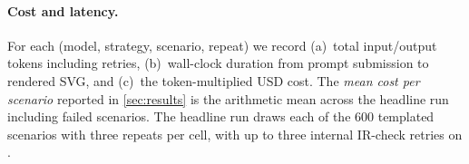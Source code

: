 \paragraph{Cost and latency.}
For each (model, strategy, scenario, repeat) we record (a)~total input/output tokens including retries, (b)~wall-clock duration from prompt submission to rendered SVG, and (c)~the token-multiplied USD cost.
The \emph{mean cost per scenario} reported in \cref{sec:results} is the arithmetic mean across the headline run including failed scenarios.
The headline run draws each of the $600$ templated scenarios with three repeats per cell, with up to three internal IR-check retries on \structured.

